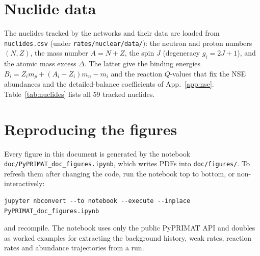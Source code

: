 \documentclass[11pt,a4paper]{article}
\newcommand{\code}[1]{\texttt{#1}}
\begin{document}


\section{Nuclide data}\label{app:nuclides}
The nuclides tracked by the networks and their data are loaded from
\code{nuclides.csv} (under \code{rates/nuclear/data/}): the neutron and proton
numbers $(N,Z)$,
the mass number $A=N+Z$, the spin $J$ (degeneracy $g_i=2J+1$), and the atomic
mass excess $\Delta$. The latter give the binding energies
$B_i=Z_i m_p+(A_i-Z_i)m_n-m_i$ and the reaction $Q$-values that fix the
NSE abundances and the detailed-balance coefficients of App.~\ref{app:nse}.
Table~\ref{tab:nuclides} lists all 59 tracked nuclides.



\section{Reproducing the figures}
Every figure in this document is generated by the notebook
\code{doc/PyPRIMAT\_doc\_figures.ipynb}, which writes PDFs into
\code{doc/figures/}. To refresh them after changing the code, run the notebook
top to bottom, or non-interactively:
\begin{lstlisting}[style=sh]
jupyter nbconvert --to notebook --execute --inplace PyPRIMAT_doc_figures.ipynb
\end{lstlisting}
and recompile. The notebook uses only the public PyPRIMAT API and doubles as
worked examples for extracting the background history, weak rates, reaction
rates and abundance trajectories from a run.
\end{document}
